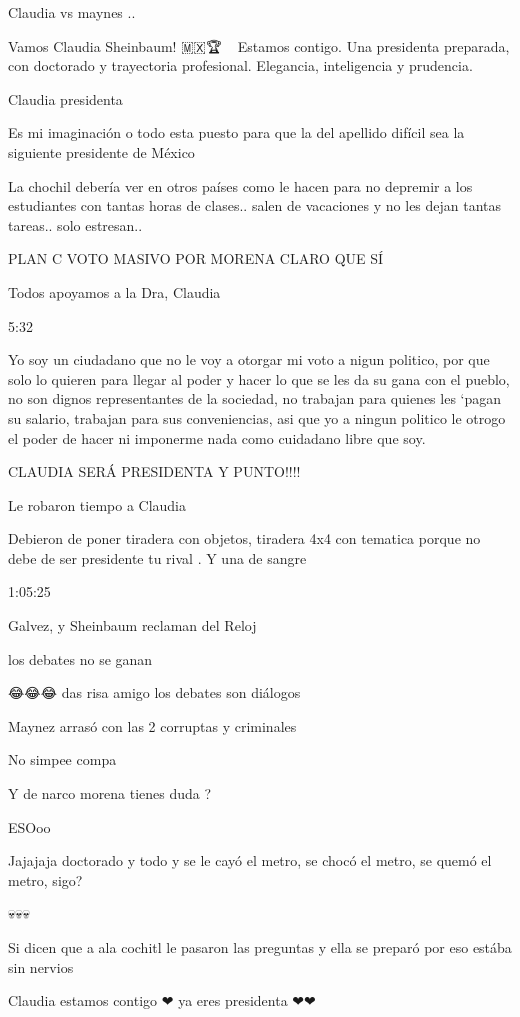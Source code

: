  Claudia vs maynes ..

Vamos Claudia Sheinbaum! 🇲🇽🏆👩🏻‍💼
Estamos contigo. Una presidenta preparada, con doctorado y trayectoria profesional. Elegancia, inteligencia y prudencia.

Claudia presidenta

Es mi imaginación o todo esta puesto para que la del apellido difícil sea la siguiente presidente de México

La chochil debería ver en otros países como le hacen para no depremir a los estudiantes con tantas horas de clases.. salen de vacaciones y no les dejan tantas tareas.. solo estresan..

PLAN C VOTO MASIVO POR MORENA CLARO QUE SÍ

Todos apoyamos a la Dra, Claudia

5:32

Yo soy un ciudadano que no le voy a otorgar mi voto a nigun politico, por que solo lo quieren para llegar al poder y hacer lo que se les da su gana con el pueblo, no son dignos representantes de la sociedad, no trabajan para quienes les `pagan su salario, trabajan para sus conveniencias,  asi que yo a ningun politico le otrogo el poder de hacer ni imponerme nada como cuidadano libre que soy.

CLAUDIA  SERÁ PRESIDENTA Y PUNTO!!!!

Le robaron tiempo a Claudia

Debieron de poner tiradera con objetos, tiradera 4x4 con tematica porque no debe de ser presidente tu rival . 
Y una de sangre

1:05:25 

Galvez, y Sheinbaum reclaman del Reloj

los debates no se ganan

😂😂😂 das risa amigo los debates son diálogos

Maynez arrasó con las 2 corruptas y criminales

No simpee compa

Y de narco morena tienes duda ?

ESOoo

Jajajaja doctorado y todo y se le cayó el metro, se chocó el metro, se quemó el metro, sigo?

💀💀💀🤡🤡🤡

Si dicen que a ala cochitl le pasaron las preguntas y ella se preparó por eso estába sin nervios

Claudia estamos contigo ❤ ya eres presidenta ❤❤

